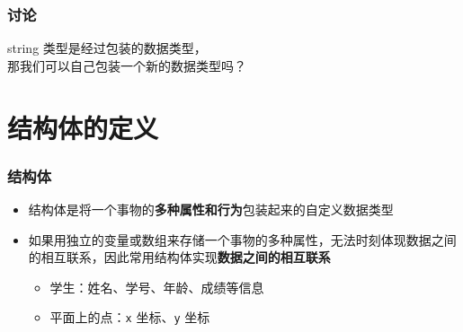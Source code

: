 \begin{frame}[fragile]
    \frametitle{讨论}

    \begin{block}{}
        \vspace{.5cm}
        \begin{center}
            {\Large string 类型是经过包装的数据类型，\\那我们可以自己包装一个新的数据类型吗？}
        \end{center}
        \vspace{.5cm}
    \end{block}
\end{frame}

\section{结构体的定义}

\begin{frame}[fragile]
    \frametitle{结构体}

    \begin{itemize}
        \item<1-> 结构体是将一个事物的\textbf{多种属性和行为}包装起来的自定义数据类型
        \item<2-> 如果用独立的变量或数组来存储一个事物的多种属性，无法时刻体现数据之间的相互联系，因此常用结构体实现\textbf{数据之间的相互联系}
            \begin{itemize}
                \item<3-> 学生：姓名、学号、年龄、成绩等信息
                \item<3-> 平面上的点：\lstinline|x| 坐标、\lstinline|y| 坐标
            \end{itemize}
    \end{itemize}

\end{frame}

